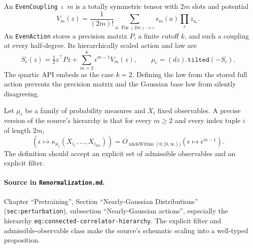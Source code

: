 \begin{definition}
\label{def:renorm:evenAction}
An \texttt{EvenCoupling $\iota$ $m$} is a totally symmetric tensor with $2m$ slots and potential
\[
 V_m(z)=\frac1{(2m)!}\sum_{a:\operatorname{Fin}(2m)\to\iota}
 s_m(a)\prod_r z_{a_r}.
\]
An \texttt{EvenAction} stores a precision matrix $P$, a finite cutoff $k$, and such a coupling at
every half-degree.  Its hierarchically scaled action and law are
\[
 S_\epsilon(z)=\tfrac12z^\top Pz+
   \sum_{m=2}^{k}\epsilon^{m-1}V_m(z),\qquad
 \mu_\epsilon=(dz).\texttt{tilted}(-S_\epsilon).
\]
The quartic API embeds as the case $k=2$.  Defining the law from the stored full action prevents
the precision matrix and the Gaussian base law from silently disagreeing.
\end{definition}

\begin{definition}
\label{def:renorm:hierarchical}
Let $\mu_\epsilon$ be a family of probability measures and $X_i$ fixed observables.  A precise
version of the source's hierarchy is that for every $m\geq2$ and every index tuple $i$ of length
$2m$,
\[
 \left(\epsilon\mapsto
   \kappa_{\mu_\epsilon}(X_{i_1},\ldots,X_{i_{2m}})\right)
 =O_{\operatorname{nhdsWithin}(0,[0,\infty))}
   (\epsilon\mapsto\epsilon^{m-1}).
\]
The definition should accept an explicit set of admissible observables and an explicit filter.

\paragraph{Source in \texttt{Renormalization.md}.}
Chapter ``Pretraining'', Section ``Nearly-Gaussian Distributions'' (\texttt{sec:perturbation}),
subsection ``Nearly-Gaussian actions'', especially the hierarchy
\texttt{eq:connected-correlator-hierarchy}.  The explicit filter and admissible-observable class
make the source's schematic scaling into a well-typed proposition.
\end{definition}

